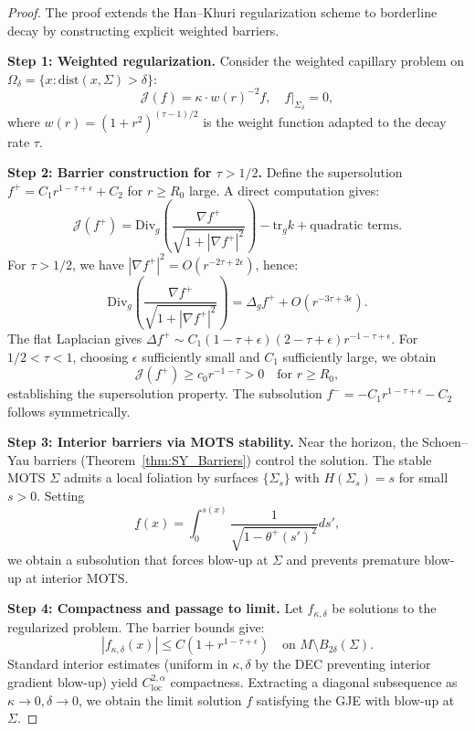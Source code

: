 \begin{proof}
The proof extends the Han--Khuri regularization scheme to borderline decay by constructing explicit weighted barriers.

\textbf{Step 1: Weighted regularization.}
Consider the weighted capillary problem on $\Omega_\delta = \{x : \mathrm{dist}(x, \Sigma) > \delta\}$:
\[
\mathcal{J}(f) = \kappa \cdot w(r)^{-2} f, \quad f|_{\Sigma_\delta} = 0,
\]
where $w(r) = (1 + r^2)^{(\tau-1)/2}$ is the weight function adapted to the decay rate $\tau$.

\textbf{Step 2: Barrier construction for $\tau > 1/2$.}
Define the supersolution $f^+ = C_1 r^{1-\tau+\epsilon} + C_2$ for $r \geq R_0$ large. A direct computation gives:
\[
\mathcal{J}(f^+) = \text{Div}_g\left(\frac{\nabla f^+}{\sqrt{1+|\nabla f^+|^2}}\right) - \text{tr}_g k + \text{quadratic terms}.
\]
For $\tau > 1/2$, we have $|\nabla f^+|^2 = O(r^{-2\tau+2\epsilon})$, hence:
\[
\text{Div}_g\left(\frac{\nabla f^+}{\sqrt{1+|\nabla f^+|^2}}\right) = \Delta_g f^+ + O(r^{-3\tau+3\epsilon}).
\]
The flat Laplacian gives $\Delta f^+ \sim C_1(1-\tau+\epsilon)(2-\tau+\epsilon) r^{-1-\tau+\epsilon}$. For $1/2 < \tau < 1$, choosing $\epsilon$ sufficiently small and $C_1$ sufficiently large, we obtain
\[
\mathcal{J}(f^+) \geq c_0 r^{-1-\tau} > 0 \quad \text{for } r \geq R_0,
\]
establishing the supersolution property. The subsolution $f^- = -C_1 r^{1-\tau+\epsilon} - C_2$ follows symmetrically.

\textbf{Step 3: Interior barriers via MOTS stability.}
Near the horizon, the Schoen--Yau barriers (Theorem~\ref{thm:SY_Barriers}) control the solution. The stable MOTS $\Sigma$ admits a local foliation by surfaces $\{\Sigma_s\}$ with $H(\Sigma_s) = s$ for small $s > 0$. Setting
\[
\underline{f}(x) = \int_0^{s(x)} \frac{1}{\sqrt{1-\theta^+(s')^2}} ds',
\]
we obtain a subsolution that forces blow-up at $\Sigma$ and prevents premature blow-up at interior MOTS.

\textbf{Step 4: Compactness and passage to limit.}
Let $f_{\kappa,\delta}$ be solutions to the regularized problem. The barrier bounds give:
\[
|f_{\kappa,\delta}(x)| \leq C(1 + r^{1-\tau+\epsilon}) \quad \text{on } M \setminus B_{2\delta}(\Sigma).
\]
Standard interior estimates (uniform in $\kappa, \delta$ by the DEC preventing interior gradient blow-up) yield $C^{2,\alpha}_{\mathrm{loc}}$ compactness. Extracting a diagonal subsequence as $\kappa \to 0, \delta \to 0$, we obtain the limit solution $f$ satisfying the GJE with blow-up at $\Sigma$.


\end{proof}
